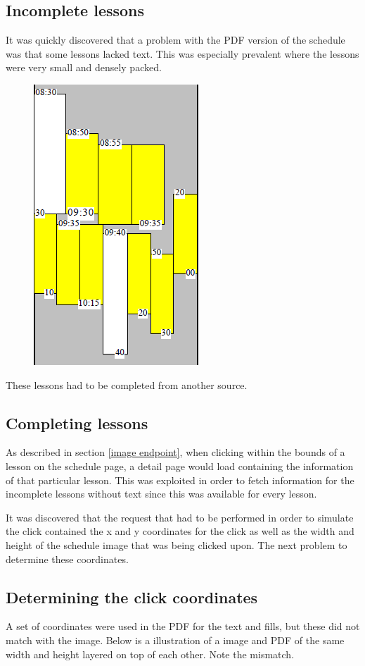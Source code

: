 \documentclass{article}
\begin{document}
	\subsection{Incomplete lessons}
	It was quickly discovered that a problem with the PDF version of the schedule was that some lessons lacked text. This was especially prevalent where the lessons were very small and densely packed.
	
	\begin{figure}[h]
		\centering
		\includegraphics[width=0.3\linewidth]{images/pdf-no-text}
		\caption{}
		\label{fig:pdf-no-text}
	\end{figure}
	
	These lessons had to be completed from another source.
	
	\subsection{Completing lessons}
	As described in section \ref{image endpoint}, when clicking within the bounds of a lesson on the schedule page, a detail page would load containing the information of that particular lesson. This was exploited in order to fetch information for the incomplete lessons without text since this was available for every lesson.
	
	It was discovered that the request that had to be performed in order to simulate the click contained the x and y coordinates for the click as well as the width and height of the schedule image that was being clicked upon. The next problem to determine these coordinates.
	
	\subsection{Determining the click coordinates}
	A set of coordinates were used in the PDF for the text and fills, but these did not match with the image. Below is a illustration of a image and PDF of the same width and height layered on top of each other. Note the mismatch.
	
\end{document}
